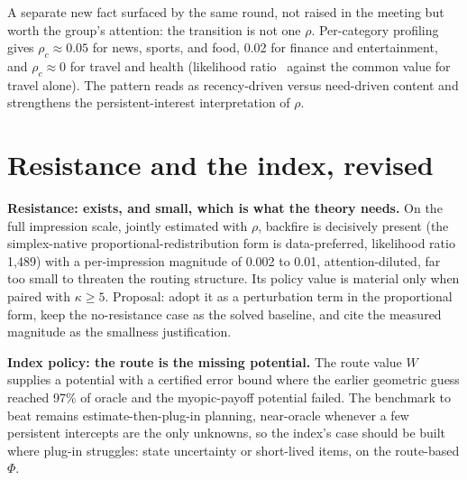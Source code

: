 \documentclass[11pt]{article}
\begin{document}
A separate new fact surfaced by the same round, not raised in the
meeting but worth the group's attention: the transition is not one
$\rho$. Per-category profiling gives $\rho_c\approx0.05$ for news,
sports, and food, 0.02 for finance and entertainment, and
$\rho_c\approx0$ for travel and health (likelihood ratio \rhoTravelLR\
against the common value for travel alone). The pattern reads as
recency-driven versus need-driven content and strengthens the
persistent-interest interpretation of $\rho$.

\section{Resistance and the index, revised}

\textbf{Resistance: exists, and small, which is what the theory needs.}
On the full impression scale, jointly estimated with $\rho$, backfire is
decisively present (the simplex-native proportional-redistribution form
is data-preferred, likelihood ratio 1{,}489) with a per-impression
magnitude of 0.002 to 0.01, attention-diluted, far too small to threaten
the routing structure. Its policy value is material only when paired with
$\kappa\ge5$. Proposal: adopt it as a perturbation term in the
proportional form, keep the no-resistance case as the solved baseline,
and cite the measured magnitude as the smallness justification.

\textbf{Index policy: the route is the missing potential.} The route
value $W$ supplies a potential with a certified error bound where the
earlier geometric guess reached 97\% of oracle and the myopic-payoff
potential failed. The benchmark to beat remains estimate-then-plug-in
planning, near-oracle whenever a few persistent intercepts are the only
unknowns, so the index's case should be built where plug-in struggles:
state uncertainty or short-lived items, on the route-based $\Phi$.
\end{document}
